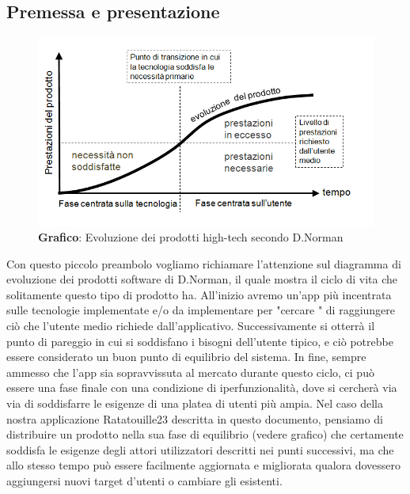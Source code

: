 \subsection{Premessa e presentazione}
    \begin{figure}[H]
        \centering
        \includegraphics[scale=0.5]{assets/diagrammi/immagini varie/D.Norman grafico.png}
        \caption{\textbf{Grafico}: Evoluzione dei prodotti high-tech secondo D.Norman}\label{fig:Mockup_Homepage}
    \end{figure}

    \begin{flushleft}
        Con questo piccolo preambolo vogliamo richiamare l'attenzione sul diagramma di evoluzione dei prodotti software di D.Norman,
        il quale mostra il ciclo di vita che solitamente questo tipo di prodotto ha.
        All'inizio avremo un'app più incentrata sulle tecnologie implementate e/o da implementare per  "cercare " di
        raggiungere ciò che l'utente medio richiede dall'applicativo. Successivamente si otterrà il punto di pareggio in cui si soddisfano
        i bisogni dell'utente tipico, e ciò potrebbe essere considerato un buon punto di equilibrio del sistema.
        In fine, sempre ammesso che l'app sia sopravvissuta al mercato durante questo ciclo, ci può essere una fase finale con una condizione
        di iperfunzionalità, dove si cercherà via via di soddisfarre le esigenze di una platea di utenti più ampia.
        Nel caso della nostra applicazione Ratatouille23 descritta in questo documento, pensiamo di distribuire un prodotto nella sua 
        fase di equilibrio (vedere grafico) che certamente soddisfa le esigenze degli attori utilizzatori descritti nei punti successivi, 
        ma che allo stesso tempo può essere facilmente aggiornata e migliorata qualora dovessero aggiungersi nuovi target d'utenti o cambiare
        gli esistenti.
    \end{flushleft}
 